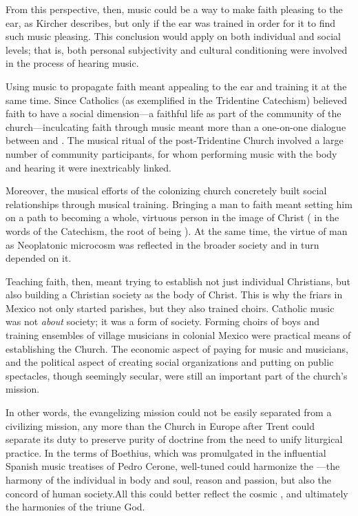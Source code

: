 From this perspective, then, music could be a way to make faith pleasing to the ear, as Kircher describes, but only if the ear was trained in order for it to find such music pleasing.
This conclusion would apply on both individual and social levels; that is, both personal subjectivity and cultural conditioning were involved in the process of hearing music.

Using music to propagate faith meant appealing to the ear and training it at the same time. 
Since Catholics (as exemplified in the Tridentine Catechism) believed faith to have a social dimension---a faithful life as part of the community of the church---inculcating faith through music meant more than a one-on-one dialogue between  and .
The musical ritual of the post-Tridentine Church involved a large number of community participants, for whom performing music with the body and hearing it were inextricably linked.

Moreover, the musical efforts of the colonizing church concretely built social relationships through musical training.
Bringing a man to faith meant setting him on a path to becoming a whole, virtuous person in the image of Christ ( in the words of the Catechism, the root of  being ).%
  \autocite[8]{Catholic:Catechismus1614}
At the same time, the virtue of man as Neoplatonic microcosm was reflected in the broader society and in turn depended on it. 

Teaching faith, then, meant trying to establish not just individual Christians, but also building a Christian society as the body of Christ.
This is why the friars in Mexico not only started parishes, but they also trained choirs.
Catholic music was not \emph{about} society; it was a form of society.
Forming choirs of boys and training ensembles of village musicians in colonial Mexico were practical means of establishing the Church.
The economic aspect of paying for music and musicians, and the political aspect of creating social organizations and putting on public spectacles, though seemingly secular, were still an important part of the church's mission.

In other words, the evangelizing mission could not be easily separated from a civilizing mission, any more than the Church in Europe after Trent could separate its duty to preserve purity of doctrine from the need to unify liturgical practice. 
In the terms of Boethius, which was promulgated in the influential Spanish music treatises of Pedro Cerone, well-tuned  could harmonize the ---the harmony of the individual in body and soul, reason and passion, but also the concord of human society.
All this could better reflect the cosmic , and ultimately the harmonies of the triune God.

